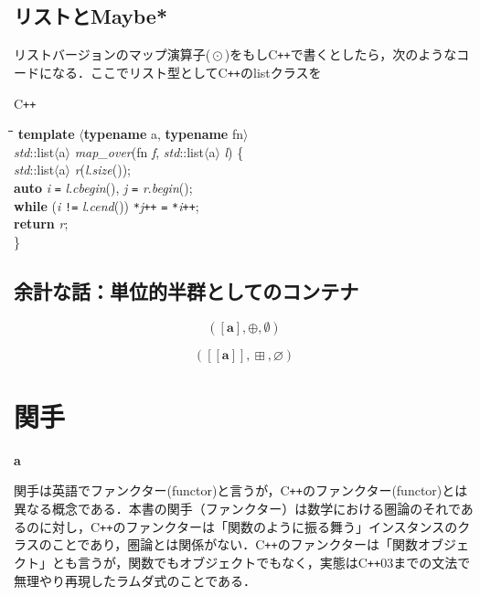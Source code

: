 \documentclass[twocolumn]{jsbook}
\def\[{[\![}
\def\]{]\!]}
\newcommand{\cxx}{\textrm{C}\texttt{++}}
\newenvironment{leader}{\begingroup\bf}{\endgroup}
\newenvironment{cxxcode}{\begin{itembox}[r]{\cxx}}{\end{itembox}}
\newenvironment{python}{\begin{tabbing}\hspace*{1em}\=\hspace*{1em}\=\hspace*{1em}\=\hspace*{1em}\=\kill}{\end{tabbing}}
\newcommand{\pthnClassname}[1]{\textrm{#1}}
\newcommand{\pthnId}[1]{\textit{#1}}
\newcommand{\pthnKeyword}[1]{\textbf{#1}}
\newcommand{\pthnOp}[1]{\texttt{#1}}
\newcommand{\hsklType}[1]{\textbf{#1}}
\DeclareMathOperator{\hsklMap}{\odot}
\DeclareMathOperator{\hsklMaybeAppend}{\boxplus}
\newcommand{\hsklAppend}{\oplus}
\newcommand{\hsklEmptyList}{\emptyset}
\newcommand{\hsklNothing}{\varnothing}
\newcommand{\hsklListType}[1]{[#1]}
\newcommand{\hsklMaybeType}[1]{\[#1\]}
\newcommand{\mathMonoid}[3]{(#1,#2,#3)}
\begin{document}
\section{リストとMaybe*}

リストバージョンのマップ演算子($\hsklMap$)をもし\cxx で書くとしたら，次のようなコードになる．ここでリスト型として\cxx のlistクラスを
\begin{cxxcode}
\begin{python}
\pthnKeyword{template} $\langle$\pthnKeyword{typename} \pthnClassname{a}, \pthnKeyword{typename} \pthnClassname{fn}$\rangle$\\
\pthnId{std}::\pthnClassname{list}$\langle$\pthnClassname{a}$\rangle$ \pthnId{map\_over}(\pthnClassname{fn} \pthnId{f}, \pthnId{std}::\pthnClassname{list}$\langle$\pthnClassname{a}$\rangle$ \pthnId{l}) \{\\
\>\pthnId{std}::\pthnClassname{list}$\langle$a$\rangle$ \pthnId{r}(\pthnId{l}.\pthnId{size}());\\
\>\pthnKeyword{auto} \pthnId{i} \pthnOp{=} \pthnId{l}.\pthnId{cbegin}(), \pthnId{j} \pthnOp{=} \pthnId{r}.\pthnId{begin}();\\
\>\pthnKeyword{while} (\pthnId{i} \pthnOp{!=} \pthnId{l}.\pthnId{cend}()) \pthnOp{*}\pthnId{j}\pthnOp{++} \pthnOp{=} \pthnOp{*}\pthnId{i}\pthnOp{++};\\
\>\pthnKeyword{return} \pthnId{r};\\
\}
\end{python}
\end{cxxcode}




\section{余計な話：単位的半群としてのコンテナ}

$$\mathMonoid{\hsklListType{\hsklType{a}}}{\hsklAppend}{\hsklEmptyList}$$

$$\mathMonoid{\hsklMaybeType{\hsklType{a}}}{\hsklMaybeAppend}{\hsklNothing}$$


\chapter{関手}
\label{ch:functor}

\begin{leader}
a
\end{leader}

\begin{boxnote}
関手は英語でファンクター(functor)と言うが，\cxx のファンクター(functor)とは異なる概念である．本書の関手（ファンクター）は数学における圏論のそれであるのに対し，\cxx のファンクターは「関数のように振る舞う」インスタンスのクラスのことであり，圏論とは関係がない．\cxx のファンクターは「関数オブジェクト」とも言うが，関数でもオブジェクトでもなく，実態は\cxx03までの文法で無理やり再現したラムダ式のことである．
\end{boxnote}
\end{document}

